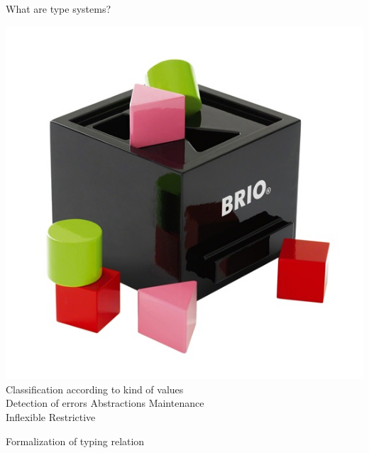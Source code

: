 \documentclass[xcolor=dvipsnames]{beamer}
\begin{document}
\begin{frame}{What are type systems?}
  \begin{center}
    \includegraphics[scale=1]{shape_toy.jpg} \\
    Classification according to kind of values \\
    \bigskip
    \textcolor{OliveGreen}{Detection of errors \qquad Abstractions \qquad Maintenance} \\
    \textcolor{BrickRed}{Inflexible \qquad Restrictive}
  \end{center}
\end{frame}

\begin{frame}{Formalization of typing relation}
  \begin{center}
    \Large
    \small
  \vspace{20pt}
  \end{center}
\end{frame}
\end{document}
